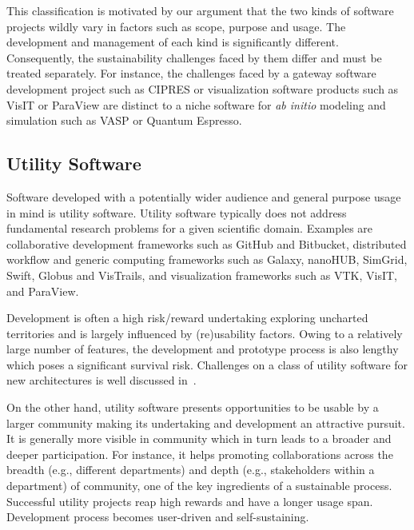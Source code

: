 \documentclass[11pt, oneside]{amsart}
\newcommand{\note}[1]{ {\textcolor{red}    { #1 }}}
\newcommand{\toolname}[1] {\textsf{#1}}
\begin{document}
This classification is motivated by our argument that the two kinds of
software projects wildly vary in factors such as scope, purpose and
usage. The development and management of each kind is significantly
different. Consequently, the sustainability challenges faced by them
differ and must be treated separately. For instance, the challenges
faced by a gateway software development project such as
\toolname{CIPRES} or visualization software products such as
\toolname{VisIT} or \toolname{ParaView} are distinct to a niche software for
\textit{ab initio} modeling and simulation such as \toolname{VASP} or
\toolname{Quantum Espresso}. %

\subsection{Utility Software}
Software developed with a potentially wider audience and general
purpose usage in mind is utility software. Utility software typically
does not address fundamental research problems for a given scientific
domain. Examples are collaborative development frameworks such as
\toolname{GitHub} and \toolname{Bitbucket}, distributed workflow and
generic computing frameworks such as \toolname{Galaxy},
\toolname{nanoHUB}, \toolname{SimGrid}, \toolname{Swift},
\toolname{Globus} and \toolname{VisTrails}, and visualization
frameworks such as \toolname{VTK}, \toolname{VisIT}, and \toolname{ParaView}.

Development is often a high risk/reward undertaking exploring
uncharted territories and is largely influenced by (re)usability
factors. Owing to a relatively large number of features, the development
and prototype process is also lengthy which poses a significant
survival risk. Challenges on a class of utility software for new
architectures is well discussed in~\cite{Ferenbaugh_WSSSPE}.

On the other hand, utility software presents opportunities to be usable by a
larger community making its undertaking and development an attractive pursuit.
It is generally more visible in community which in turn leads to a broader and
deeper participation. For instance, it helps promoting collaborations across
the breadth (e.g., different departments) and depth (e.g., stakeholders within
a department) of community, one of the key ingredients of a sustainable
process. Successful utility projects reap high rewards and have a longer usage
span. Development process becomes user-driven and self-sustaining.
\end{document}
